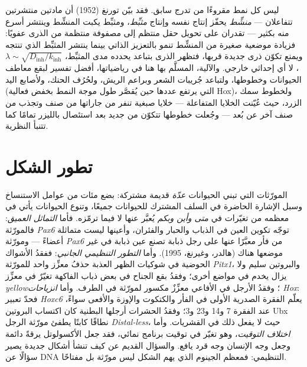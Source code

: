 \begin{proposition}\label{prop:b3:developmental-genetics:turing}
ليس كل نمط مقروءًا من تدرج سابق. فقد بيّن تورنغ (1952) أن
مادتين منتشرتين تتفاعلان --- \emph{منشِّط} يحفّز إنتاج نفسه
وإنتاج \emph{مثبِّط}، ومثبِّط يكبت المنشِّط وينتشر أسرع منه
بكثير --- تقدران على تحويل حقل منتظم إلى مصفوفة منتظمة من
الذرى عفويًا: فزيادة موضعية صغيرة من المنشِّط تنمو بالتعزيز
الذاتي بينما ينتشر المثبِّط الذي تنتجه ويمنع تكوّن ذرى
جديدة قربها، فتظهر الذرى بتباعد يحدده مدى المثبِّط،
$\lambda \sim \sqrt{D_{\text{inh}}/k_{\text{inh}}}$،
لا أي إحداثي خارجي. والآلية، المسلَّم بها هنا في رياضياتها،
أفضل تفسير لبقع معاطف الحيوانات وخطوطها، ولتباعد جُريبات
الشعر وبراعم الريش، ولحُرُف الحنك، ولأصابع اليد (التي يرتفع
عددها حين يُقصَّر طول موجة النمط بخفض فعالية Hox)، ولخطوط
سمك الزرد، حيث عُيّنت الخلايا المتفاعلة --- خلايا صبغية
تنفر من جاراتها من صنف وتجذب من صنف آخر عن بُعد --- وجُعلت
خطوطها تتكوّن من جديد بعد استئصال بالليزر تمامًا كما تتنبأ
النظرية.
\end{proposition}
\admitted

\section{تطور الشكل}

\begin{definition}\label{def:b3:developmental-genetics:evodevo}
المورّثات التي تبني الحيوانات \emph{عدّة} قديمة مشتركة: بضع
مئات من عوامل الاستنساخ وسبل الإشارة الحاضرة في السلف
المشترك للحيوانات جميعًا، وتنوع الحيوانات يأتي في معظمه من
تغيّرات في \emph{متى وأين وبكم} يُعبَّر عنها لا فيما ترمّزه.
فأما \emph{التماثل العميق}: فالمورّثة \emph{Pax6} توجّه تكوين
العين في الذباب والحبار والفئران، وأعينها ليست متماثلة
أعضاءً --- ومورّثة \emph{Pax6} من فأر معبَّرًا عنها على رجل
ذبابة تصنع عين ذبابة في غير موضعها هناك (هالدر، وغيرنغ،
1995). وأما \emph{التطور التنظيمي الجانبي}: ففقدُ الأشواك
الحوضية في شوكيات الظهر العذبة حذفُ معزِّز واحد للمورّثة
\emph{Pitx1}، والبروتين سليم ولا يزال يخدم في مواضع أخرى؛
وفقدُ بقع الجناح في بعض ذباب الفاكهة تغيّرٌ في معزِّز
\emph{yellow}؛ وفقدُ الأرجل في الأفاعي معزِّزٌ مكسور لمورّثة
\emph{} في الطرف. وأما \emph{انزياحات Hox}:
فحدّ تعبير \emph{Hoxc6} يعلّم الفقرة الصدرية الأولى في الفأر
والكتكوت والإوزة والأفعى سواءً، عند الفقرة 7 و14 و23 و3؛
وفقدُ الحشرات أرجلها البطنية كان اكتساب البروتين Ubx نطاقًا
كابتًا يطفئ مورّثة الرجل \emph{Distal-less}، حيث لا يفعل ذلك
في القشريات. وأما \emph{اختلاف التوقيت}، وهو تغيّر في توقيت
برنامج نمائي، فقد جعل الأكسولوتل يرقةً دائمة وجعل وجه
الإنسان وجه قرد يافع. والسؤال القديم عن كيف تنشأ أشكال
جديدة يصير سؤالًا عن DNA التنظيمي: فمعظم الجينوم الذي يهم
الشكل ليس مورّثة بل مفتاحًا.
\end{definition}

